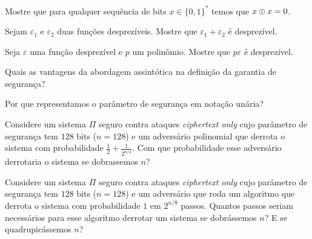 \begin{exercicio}
  Mostre que para qualquer sequência de bits $x \in \{0,1\}^*$ temos que $x \oplus x = 0$.
\end{exercicio}

\begin{exercicio}
  Sejam $\varepsilon_1$ e $\varepsilon_2$ duas funções desprezíveis.
  Mostre que $\varepsilon_1 + \varepsilon_2$ é desprezível.
\end{exercicio}

\begin{exercicio}
  Seja $\varepsilon$ uma função desprezível e $p$ um polinômio.
  Mostre que $p\varepsilon$ é desprezível.
\end{exercicio}

\begin{exercicio}
  Quais as vantagens da abordagem assintótica na definição da garantia de segurança?
\end{exercicio}

\begin{exercicio}
  Por que representamos o parâmetro de segurança em notação unária?
\end{exercicio}

\begin{exercicio}
  Considere um sistema $\Pi$ seguro contra ataques {\em ciphertext only} cujo parâmetro de segurança tem $128$ bits ($n = 128$) e um adversário polinomial que derrota o sistema com probabilidade $\frac{1}{2} + \frac{1}{2^{n/4}}$.
Com que probabilidade esse adversário derrotaria o sistema se dobrassemos $n$?
\end{exercicio}

\begin{exercicio}
  Considere um sistema $\Pi$ seguro contra ataques {\em ciphertext only} cujo parâmetro de segurança tem $128$ bits ($n = 128$) e um adversário que roda um algoritmo que derrota o sistema com probabilidade $1$ em $2^{n/8}$ passos.
  Quantos passos seriam necessários para esse algoritmo derrotar um sistema se dobrássemos $n$? E se quadrupicássemos $n$?
\end{exercicio}
